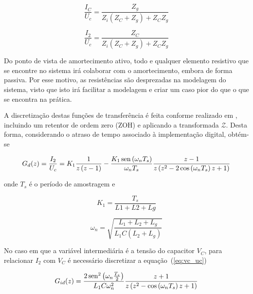     \begin{equation}
        \frac{I_C}{U_c} = \frac{Z_g}{Z_i \left( Z_C + Z_g \right) + Z_C Z_g}
        \label{eq:ic_uc}
    \end{equation}

    \begin{equation}
        \frac{I_2}{U_c} = \frac{Z_C}{Z_i \left( Z_C + Z_g \right) + Z_C Z_g}
    \end{equation}

    Do ponto de vista de amortecimento ativo, todo e qualquer elemento resistivo
    que se encontre no sistema irá colaborar com o amortecimento, embora de forma
    passiva. Por esse motivo, as resistências são desprezadas na modelagem do
    sistema, visto que isto irá facilitar a modelagem e criar um caso pior do que
    o que se encontra na prática.

    A discretização destas funções de transferência é feita conforme realizado
    em \cite{ref:PARKER}, incluindo um retentor de ordem zero (ZOH) e aplicando a
    transformada $\mathcal{Z}$. Desta forma, considerando o atraso de tempo associado
    à implementação digital, obtém-se

    \begin{equation}
        G_d (z) = \frac{I_2}{U_c} = K_1 \frac{1}{z \left( z-1 \right)}
        - \frac{K_1 \operatorname{sen} \left( \omega_n T_s \right) }{\omega_n T_s}
        \frac{z-1}{z \left( z^2 - 2 \cos\left( \omega_n T_s \right) z +1 \right) }
    \end{equation}

    onde $T_s$ é o período de amostragem e

    \begin{equation*}
        K_1 = \frac{T_s}{L1 + L2 + Lg}
    \end{equation*}

    \begin{equation*}
        \omega_n = \sqrt{\frac{ L_1 + L_2 + L_g }{ L_1 C \left( L_2 + L_g \right)}}
    \end{equation*}

    No caso em que a variável intermediária é a tensão do capacitor $V_C$, para
    relacionar $I_2$ com $V_C$ é necessário discretizar a equação~(\ref{eq:vc_uc})

    \begin{equation}
        G_{id}(z) = \frac{2 \operatorname{sen}^2 \left( \omega_n \frac{T_s}{2} \right)}{L_1 C \omega_n^2}
            \frac{z+1}{z \left( z^2 - \cos \left( \omega_n T_s \right) z + 1 \right)}
    \end{equation}

